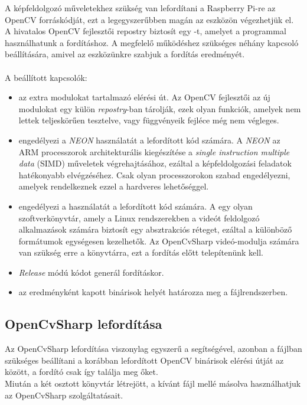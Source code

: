 A képfeldolgozó műveletekhez szükség van lefordítani a Raspberry Pi-re az OpenCV forráskódját, ezt a legegyszerűbben magán az eszközön végezhetjük el. A hivatalos OpenCV fejlesztői repostry biztosít egy -t, amelyet a  programmal használhatunk a fordításhoz.\cite{opencv} A megfelelő működéshez szükséges néhány kapcsoló beállítására, amivel az eszközünkre szabjuk a fordítás eredményét.\\
\\
A beállított kapcsolók:
\begin{itemize}
\item {} az extra modulokat tartalmazó elérési út. Az OpenCV fejlesztői az új modulokat egy külön \textit{repostry}-ban tárolják, ezek olyan funkciók, amelyek nem lettek teljeskörűen tesztelve, vagy függvényeik fejléce még nem végleges.
\item {} engedélyezi a \emph{NEON} használatát a lefordított kód számára. A \emph{NEON} az ARM processzorok architekturális kiegészítése a \textit{single instruction multiple data} (SIMD) műveletek végrehajtásához, ezáltal a képfeldolgozási feladatok hatékonyabb elvégzéséhez. Csak olyan processzorokon szabad engedélyezni, amelyek rendelkeznek ezzel a hardveres lehetőséggel.
\item {} engedélyezi a  használatát a lefordított kód számára. A  egy olyan szoftverkönyvtár, amely a Linux rendszerekben a videót feldolgozó alkalmazások számára biztosít egy absztrakciós réteget, ezáltal a különböző formátumok egységesen kezelhetők. Az OpenCvSharp videó-modulja számára van szükség erre a könyvtárra, ezt a fordítás előtt telepítenünk kell.
\item {} \textit{Release} módú kódot generál fordításkor.
\item {} az eredményként kapott binárisok helyét határozza meg a fájlrendszerben.
\end{itemize}

\subsection{OpenCvSharp lefordítása}

Az OpenCvSharp lefordítása viszonylag egyszerű a  segítségével, azonban a  fájlban szükséges beállítani a korábban lefordított OpenCV binárisok elérési útját az  között, a fordító csak így találja meg őket.\\
Miután a két osztott könyvtár létrejött, a kívánt  fájl mellé másolva használhatjuk az OpenCvSharp szolgáltatásait.

